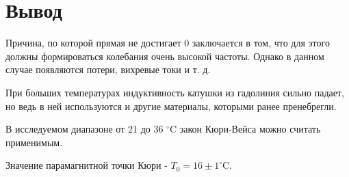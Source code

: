 \documentclass[a4paper]{article}
\theoremstyle{definition}
\theoremstyle{remark}
\begin{document}
\section{Вывод}

\noindent Причина, по которой прямая не достигает 0 заключается в том, что для этого должны формироваться колебания очень высокой частоты. Однако в данном случае появляются потери, вихревые токи и т. д. \medskip

\noindent При больших температурах индуктивность катушки из гадолиния сильно падает, но ведь в ней используются и другие материалы, которыми ранее пренебрегли. \medskip

\noindent В исследуемом диапазоне от 21 до 36 $^\circ \mathrm{C}$ закон Кюри-Вейса можно считать применимым.   \medskip

\noindent Значение парамагнитной точки Кюри - $T_0 = 16 \pm 1 ^\circ \mathrm{C}$.
\end{document}
